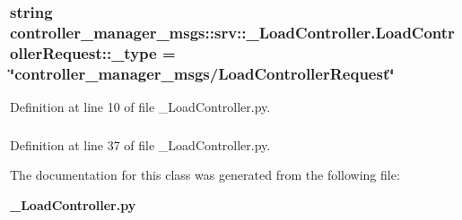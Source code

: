 \subsubsection[{\-\_\-type}]{\setlength{\rightskip}{0pt plus 5cm}string {\bf controller\-\_\-manager\-\_\-msgs\-::srv\-::\-\_\-\-Load\-Controller.\-Load\-Controller\-Request\-::\-\_\-type} = \char`\"{}controller\-\_\-manager\-\_\-msgs/{\bf \-Load\-Controller\-Request}\char`\"{}\hspace{0.3cm}{\ttfamily  [static, private]}}\label{classcontroller__manager__msgs_1_1srv_1_1__LoadController_1_1LoadControllerRequest_a88f6735c51d40e9a9cf00eb95ea6fc27}


\-Definition at line 10 of file \-\_\-\-Load\-Controller.\-py.

\subsubsection[{name}]{}\label{classcontroller__manager__msgs_1_1srv_1_1__LoadController_1_1LoadControllerRequest_a51061835323a9ff505621960179bfeeb}


\-Definition at line 37 of file \-\_\-\-Load\-Controller.\-py.



\-The documentation for this class was generated from the following file\-:\begin{DoxyCompactItemize}
\item 
{\bf \-\_\-\-Load\-Controller.\-py}\end{DoxyCompactItemize}
